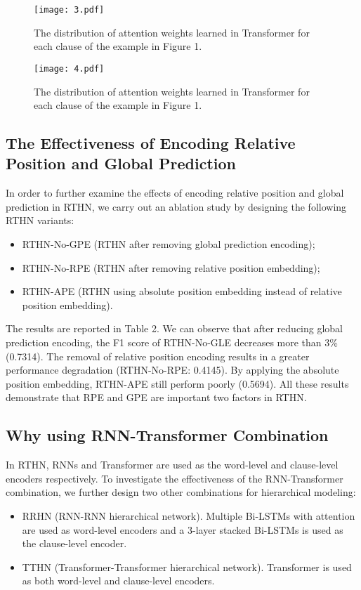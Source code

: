 \documentclass{article}
\begin{document}
\begin{figure}[!t]
\centering
\texttt{[image: 3.pdf]}
\caption{The distribution of attention weights learned in Transformer for each clause of the example in Figure 1.}
\label{fig_sim1}
\end{figure}

\begin{figure}[!t]
\centering
\texttt{[image: 4.pdf]}
\caption{The distribution of attention weights learned in Transformer for each clause of the example in Figure 1.}
\label{fig_sim1}
\end{figure}
\subsection{The Effectiveness of Encoding Relative Position and Global Prediction}
In order to further examine the effects of encoding relative position and global prediction in RTHN, we carry out an ablation study by designing the following RTHN variants:
\begin{itemize}
\item RTHN-No-GPE (RTHN after removing global prediction encoding);
\item RTHN-No-RPE (RTHN after removing relative position embedding);
\item RTHN-APE (RTHN using absolute position embedding instead of relative position embedding).
\end{itemize}

The results are reported in Table 2. We can observe that after reducing global prediction encoding, the F1 score of RTHN-No-GLE decreases more than 3\% (0.7314). The removal of relative position encoding results in a greater performance degradation (RTHN-No-RPE: 0.4145). By applying the absolute position embedding, RTHN-APE still perform poorly (0.5694). All these results demonstrate that RPE and GPE are important two factors in RTHN.

\subsection{Why using RNN-Transformer Combination}
In RTHN, RNNs and Transformer are used as the word-level and clause-level encoders respectively. To investigate the effectiveness of the RNN-Transformer combination, we further design two other combinations for hierarchical modeling:
\begin{itemize}
\item RRHN (RNN-RNN hierarchical network). Multiple Bi-LSTMs with attention are used as word-level encoders and a 3-layer stacked Bi-LSTMs is used as the clause-level encoder.
\item TTHN (Transformer-Transformer hierarchical network). Transformer is used as both word-level and clause-level encoders.
\end{itemize}
\end{document}

